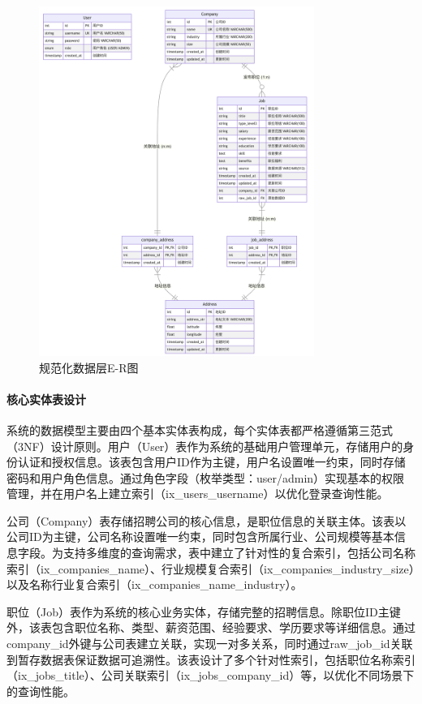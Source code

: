 \begin{figure}[htbp]
  \centering
  \includegraphics[width=0.8\textwidth]{figures/数据库实体ER图.png}
  \caption{规范化数据层E-R图}
  \label{fig:normalized_data_er}
\end{figure}


\paragraph{核心实体表设计}
系统的数据模型主要由四个基本实体表构成，每个实体表都严格遵循第三范式（3NF）设计原则。用户（User）表作为系统的基础用户管理单元，存储用户的身份认证和授权信息。该表包含用户ID作为主键，用户名设置唯一约束，同时存储密码和用户角色信息。通过角色字段（枚举类型：user/admin）实现基本的权限管理，并在用户名上建立索引（ix\_users\_username）以优化登录查询性能。

公司（Company）表存储招聘公司的核心信息，是职位信息的关联主体。该表以公司ID为主键，公司名称设置唯一约束，同时包含所属行业、公司规模等基本信息字段。为支持多维度的查询需求，表中建立了针对性的复合索引，包括公司名称索引（ix\_companies\_name）、行业规模复合索引（ix\_companies\_industry\_size）以及名称行业复合索引（ix\_companies\_name\_industry）。

职位（Job）表作为系统的核心业务实体，存储完整的招聘信息。除职位ID主键外，该表包含职位名称、类型、薪资范围、经验要求、学历要求等详细信息。通过company\_id外键与公司表建立关联，实现一对多关系，同时通过raw\_job\_id关联到暂存数据表保证数据可追溯性。该表设计了多个针对性索引，包括职位名称索引（ix\_jobs\_title）、公司关联索引（ix\_jobs\_company\_id）等，以优化不同场景下的查询性能。

